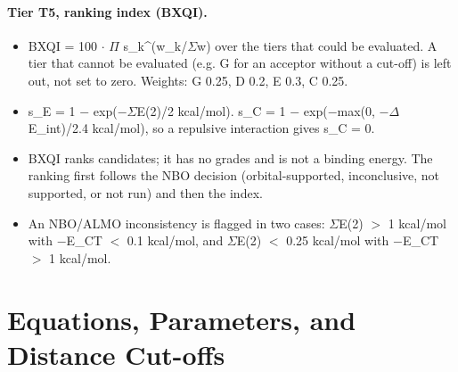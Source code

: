 \documentclass[journal=jcisd8,manuscript=suppinfo]{achemso}
\begin{document}
\begin{singlespace}
\paragraph{Tier T5, ranking index (BXQI).}
\begin{itemize}[nosep,leftmargin=*]
\item BXQI = 100 $\cdot$ $\Pi$ s\_k\^{}(w\_k/$\Sigma$w) over the tiers that could be evaluated. A tier that cannot be evaluated (e.g. G for an acceptor without a cut-off) is left out, not set to zero. Weights: G 0.25, D 0.2, E 0.3, C 0.25.
\item s\_E = 1 $-$ exp($-\Sigma$E(2)/2 kcal/mol). s\_C = 1 $-$ exp($-$max(0, $-\Delta$E\_int)/2.4 kcal/mol), so a repulsive interaction gives s\_C = 0.
\item BXQI ranks candidates; it has no grades and is not a binding energy. The ranking first follows the NBO decision (orbital-supported, inconclusive, not supported, or not run) and then the index.
\item An NBO/ALMO inconsistency is flagged in two cases: $\Sigma$E(2) $>$ 1 kcal/mol with $-$E\_CT $<$ 0.1 kcal/mol, and $\Sigma$E(2) $<$ 0.25 kcal/mol with $-$E\_CT $>$ 1 kcal/mol.
\end{itemize}

\section{Equations, Parameters, and Distance Cut-offs}
\label{sec:eq}


\end{singlespace}
\end{document}
